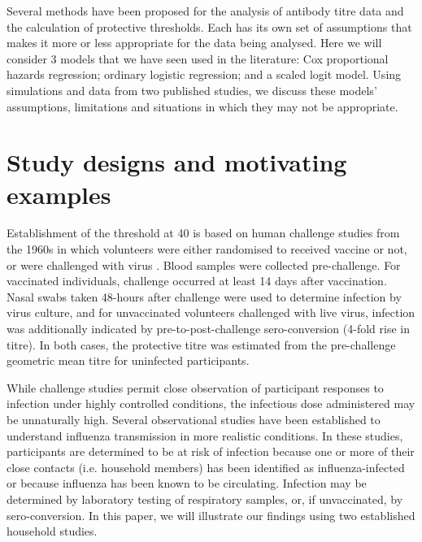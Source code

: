 \documentclass[12pt]{article}
\begin{document}

Several methods have been proposed for the analysis of antibody titre data and the calculation of protective thresholds. Each has its own set of assumptions that makes it more or less appropriate for the data being analysed. Here we will consider 3 models that we have seen used in the literature: Cox proportional hazards regression; ordinary logistic regression; and a scaled logit model. Using simulations and data from two published studies, we discuss these models' assumptions, limitations and situations in which they may not be appropriate.

\section{Study designs and motivating examples}

Establishment of the threshold at 40 is based on human challenge studies from the 1960s in which volunteers were either randomised to received vaccine or not, or were challenged with virus \citep{Hobson;1972}. Blood samples were collected pre-challenge. For vaccinated individuals, challenge occurred at least 14 days after vaccination. Nasal swabs taken 48-hours after challenge were used to determine infection by virus culture, and for unvaccinated volunteers challenged with live virus, infection was additionally indicated by pre-to-post-challenge sero-conversion (4-fold rise in titre). In both cases, the protective titre was estimated from the pre-challenge geometric mean titre for uninfected participants. 

While challenge studies permit close observation of participant responses to infection under highly controlled conditions, the infectious dose administered may be unnaturally high. Several observational studies have been established to understand influenza transmission in more realistic conditions. In these studies, participants are determined to be at risk of infection because one or more of their close contacts (i.e. household members) has been identified as influenza-infected or because influenza has been known to be circulating.  Infection may be determined by laboratory testing of respiratory samples, or, if unvaccinated, by sero-conversion. In this paper, we will illustrate our findings using two established household studies. 
\end{document}

